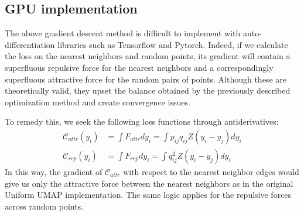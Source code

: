 \documentclass{article}
\theoremstyle{definition}
\begin{document}
\subsection{GPU implementation}

The above gradient descent method is difficult to implement with auto-differentiation libraries such as Tensorflow and Pytorch. Indeed, if we calculate the loss
on the nearest neighbors and random points, its gradient will contain a superfluous repulsive force for the nearest neighbors and a correspondingly superfluous attractive
force for the random pairs of points. Although these are theoretically valid, they upset the balance obtained by the previously described optimization method
and create convergence issues.

To remedy this, we seek the following loss functions through antiderivatives:
\begin{align*}
    \mathcal{C}_{attr}(y_i) &= \int F_{attr} dy_i = \int p_{ij} q_{ij} Z (y_i - y_j) dy_i \\
    \mathcal{C}_{rep}(y_i) &= \int F_{rep} dy_i = \int q_{ij}^2 Z (y_i - y_j) dy_i
\end{align*}
In this way, the gradient of $\mathcal{C}_{attr}$ with respect to the nearest neighbor edges would give us only the attractive force between the nearest
neighbors as in the original Uniform UMAP implementation. The same logic applies for the repulsive forces across random points.
\end{document}
